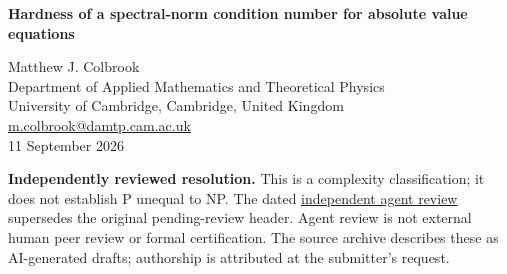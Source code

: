 \documentclass[11pt,a4paper]{article}
\theoremstyle{remark}\newtheorem{remark}[theorem]{Remark}
\newcommand{\diag}{\operatorname{diag}}
\newcommand{\header}[2]{\begin{center}{\Large\bfseries #1\par}\vspace{6pt}{\small #2\par}\end{center}\vspace{6pt}}
\begin{document}
\header{Hardness of a spectral-norm condition number for absolute value equations}{Repository AV-02. Claimed resolution; independent review pending.}
\begin{center}Matthew J. Colbrook\\{\small Department of Applied Mathematics and Theoretical Physics\\University of Cambridge, Cambridge, United Kingdom\\\href{mailto:m.colbrook@damtp.cam.ac.uk}{m.colbrook@damtp.cam.ac.uk}}\\11 September 2026\end{center}
\textbf{Independently reviewed resolution.} This is a complexity classification; it does not establish P unequal to NP.
The dated \href{https://github.com/MColbrook/OpenProblemsInNLA/blob/codex/colbrook-package-submissions/references/colbrook-intervals-2026-09-11/verification/reviews/AV-02-review.md}{independent agent review} supersedes the original pending-review header. Agent review is not external human peer review or formal certification. The source archive describes these as AI-generated drafts; authorship is attributed at the submitter's request.
\par\medskip
\begin{abstract}
We prove NP-hardness, under a polynomial-time many-one reduction, of deciding whether the maximum spectral norm of $(A-\diag d)^{-1}$ over $d\in[-1,1]^n$ is at least a rational threshold. Hardness holds for integer upper-triangular $A$ with every diagonal entry equal to 2; the entire diagonal perturbation family is automatically regular. The decision problem restricted to rational upper-triangular matrices with this diagonal is NP-complete.
\end{abstract}
\end{document}
